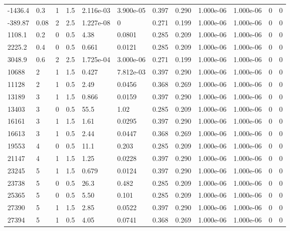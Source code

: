 \documentclass[preview]{standalone}
\begin{document}
{{\begin{tabular}{L{1.2cm}C{1.2cm} C{0.3cm}C{0.5cm} C{1.4cm}C{1.4cm} C{1.4cm}C{1.4cm} C{1.6cm}C{1.6cm} C{1.6cm}C{1.6cm}}
  -1436.4  &   0.3  & 1     & 1.5 &  2.116e-03  & 3.900e-05  &  0.397&   0.290& 1.000e-06 & 1.000e-06   &  0 & 0  \\ 
  -389.87  &  0.08  & 2     & 2.5 &  1.227e-08  & 0  &  0.271&   0.199& 1.000e-06 & 1.000e-06   &  0 & 0  \\ 
  1108.1  &   0.2  & 0     & 0.5 &  4.38  & 0.0801  &  0.285&   0.209& 1.000e-06 & 1.000e-06   &  0 & 0  \\ 
  2225.2  &   0.4  & 0     & 0.5 &  0.661  & 0.0121  &  0.285&   0.209& 1.000e-06 & 1.000e-06   &  0 & 0  \\ 
  3048.9  &   0.6  & 2     & 2.5 &  1.725e-04  & 3.000e-06  &  0.271&   0.199& 1.000e-06 & 1.000e-06   &  0 & 0  \\ 
  10688  &     2  & 1     & 1.5 &  0.427  & 7.812e-03  &  0.397&   0.290& 1.000e-06 & 1.000e-06   &  0 & 0  \\ 
  11128  &     2  & 1     & 0.5 &  2.49  & 0.0456  &  0.368&   0.269& 1.000e-06 & 1.000e-06   &  0 & 0  \\ 
  13189  &     3  & 1     & 1.5 &  0.866  & 0.0159  &  0.397&   0.290& 1.000e-06 & 1.000e-06   &  0 & 0  \\ 
  13403  &     3  & 0     & 0.5 &  55.5  & 1.02  &  0.285&   0.209& 1.000e-06 & 1.000e-06   &  0 & 0  \\ 
  16161  &     3  & 1     & 1.5 &  1.61  & 0.0295  &  0.397&   0.290& 1.000e-06 & 1.000e-06   &  0 & 0  \\ 
  16613  &     3  & 1     & 0.5 &  2.44  & 0.0447  &  0.368&   0.269& 1.000e-06 & 1.000e-06   &  0 & 0  \\ 
  19553  &     4  & 0     & 0.5 &  11.1  & 0.203  &  0.285&   0.209& 1.000e-06 & 1.000e-06   &  0 & 0  \\ 
  21147  &     4  & 1     & 1.5 &  1.25  & 0.0228  &  0.397&   0.290& 1.000e-06 & 1.000e-06   &  0 & 0  \\ 
  23245  &     5  & 1     & 1.5 &  0.679  & 0.0124  &  0.397&   0.290& 1.000e-06 & 1.000e-06   &  0 & 0  \\ 
  23738  &     5  & 0     & 0.5 &  26.3  & 0.482  &  0.285&   0.209& 1.000e-06 & 1.000e-06   &  0 & 0  \\ 
  25365  &     5  & 0     & 0.5 &  5.50  & 0.101  &  0.285&   0.209& 1.000e-06 & 1.000e-06   &  0 & 0  \\ 
  27390  &     5  & 1     & 1.5 &  2.85  & 0.0522  &  0.397&   0.290& 1.000e-06 & 1.000e-06   &  0 & 0  \\ 
  27394  &     5  & 1     & 0.5 &  4.05  & 0.0741  &  0.368&   0.269& 1.000e-06 & 1.000e-06   &  0 & 0  \\ 

\end{tabular}}}
\end{document}
